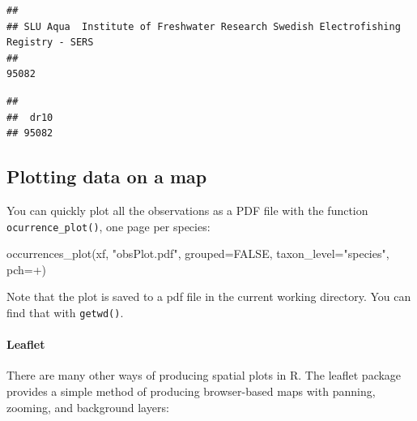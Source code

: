 \documentclass[
  10pt,
]{article}
\newenvironment{Shaded}{\begin{snugshade}}{\end{snugshade}}
\newcommand{\AttributeTok}[1]{\textcolor[rgb]{0.77,0.63,0.00}{#1}}
\newcommand{\ConstantTok}[1]{\textcolor[rgb]{0.00,0.00,0.00}{#1}}
\newcommand{\FunctionTok}[1]{\textcolor[rgb]{0.00,0.00,0.00}{#1}}
\newcommand{\NormalTok}[1]{#1}
\newcommand{\SpecialCharTok}[1]{\textcolor[rgb]{0.00,0.00,0.00}{#1}}
\newcommand{\StringTok}[1]{\textcolor[rgb]{0.31,0.60,0.02}{#1}}
\begin{document}
\begin{verbatim}
## 
## SLU Aqua  Institute of Freshwater Research Swedish Electrofishing Registry - SERS 
##                                                                             95082
\end{verbatim}

\begin{Shaded}
\end{Shaded}

\begin{verbatim}
## 
##  dr10 
## 95082
\end{verbatim}

\hypertarget{plotting-data-on-a-map}{%
\subsection{Plotting data on a map}\label{plotting-data-on-a-map}}

You can quickly plot all the observations as a PDF file with the function \texttt{ocurrence\_plot()}, one page per species:

\begin{Shaded}
\begin{Highlighting}[]
\FunctionTok{occurrences\_plot}\NormalTok{(xf, }\StringTok{"obsPlot.pdf"}\NormalTok{, }
                 \AttributeTok{grouped=}\ConstantTok{FALSE}\NormalTok{, }
                 \AttributeTok{taxon\_level=}\StringTok{"species"}\NormalTok{, }
                 \AttributeTok{pch=}\StringTok{\textquotesingle{}+\textquotesingle{}}\NormalTok{)}
\end{Highlighting}
\end{Shaded}

Note that the plot is saved to a pdf file in the current working directory. You can find that with \texttt{getwd()}.

\hypertarget{leaflet}{%
\paragraph{Leaflet}\label{leaflet}}

There are many other ways of producing spatial plots in R. The leaflet package provides a simple method of producing browser-based maps with panning, zooming, and background layers:
\end{document}
